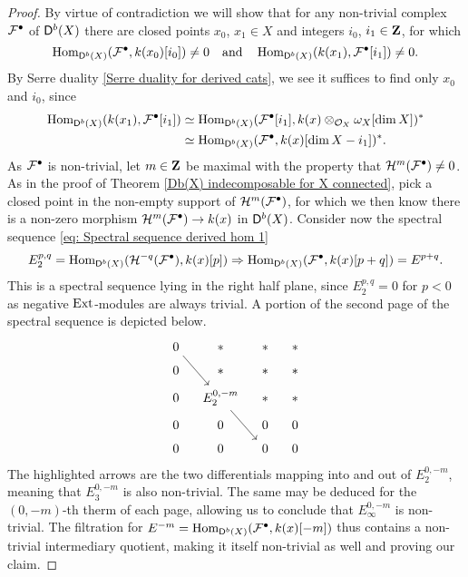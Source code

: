 \begin{proof}
    By virtue of contradiction we will show that for any non-trivial complex $\mathcal F^\bullet$ of $\mathsf{D}^b(X)$ there are closed points $x_0$, $x_1 \in X$ and integers $i_0$, $i_1 \in \mathbf Z$, for which
    \[
        \operatorname{Hom}_{\mathsf{D}^b(X)}(\mathcal F^\bullet, k(x_0)[i_0]) \neq 0 \quad \text{and} \quad \operatorname{Hom}_{\mathsf{D}^b(X)}(k(x_1), \mathcal F^\bullet[i_1]) \neq 0.
    \] 
    By Serre duality \ref{Serre duality for derived cats}, we see it suffices to find only $x_0$ and $i_0$, since
    \begin{align*}
        \operatorname{Hom}_{\mathsf{D}^b(X)}(k(x_1), \mathcal F^\bullet[i_1]) 
        &\simeq \operatorname{Hom}_{\mathsf{D}^b(X)}(\mathcal F^\bullet[i_1], k(x) \otimes_{{\mathcal{O}_{X}}} \omega_X[\dim X])^* \\
        &\simeq \operatorname{Hom}_{\mathsf{D}^b(X)}(\mathcal F^\bullet, k(x)[\dim X - i_1])^*. 
    \end{align*}
    As $\mathcal F^\bullet$ is non-trivial, let $m \in \mathbf Z$ be maximal with the property that $\mathcal{H}^m(\mathcal F^\bullet) \neq 0$. As in the proof of Theorem \ref{Db(X) indecomposable for X connected}, pick a closed point in the non-empty support of $\mathcal H^m(\mathcal F^\bullet)$, for which we then know there is a non-zero morphism $\mathcal H^m(\mathcal F^\bullet) \to k(x)$ in $\mathsf{D}^b(X)$. Consider now the spectral sequence \eqref{eq: Spectral sequence derived hom 1}
    \[
        E^{p,q}_2 = \operatorname{Hom}_{\mathsf{D}^b(X)}(\mathcal H^{-q}(\mathcal F^\bullet), k(x)[p]) \Rightarrow \operatorname{Hom}_{\mathsf{D}^b(X)}(\mathcal F^\bullet, k(x)[p+q]) = E^{p+q}.  
    \] 
    This is a spectral sequence lying in the right half plane, since $E^{p,q}_2 = 0$ for $p < 0$ as negative $\operatorname{Ext}$-modules are always trivial. A portion of the second page of the spectral sequence is depicted below.
    \[\begin{tikzcd}[column sep = 1em, row sep = 0.5em]
        0 & {*} & {*} & {*} \\
        0 & {*} & {*} & {*} \\
        0 & {E^{0, -m}_2} & {*} & {*} \\
        0 & 0 & 0 & 0 \\
        0 & 0 & 0 & 0
        \arrow[from=1-1, to=3-2]
        \arrow[from=3-2, to=5-3]
    \end{tikzcd}\]
    The highlighted arrows are the two differentials mapping into and out of $E^{0,-m}_2$, meaning that $E^{0,-m}_3$ is also non-trivial. The same may be deduced for the $(0,-m)$-th therm of each page, allowing us to conclude that $E^{0,-m}_\infty$ is non-trivial. The filtration for $E^{-m} = \operatorname{Hom}_{\mathsf{D}^b(X)}(\mathcal F^\bullet, k(x)[-m])$ thus contains a non-trivial intermediary quotient, making it itself non-trivial as well and proving our claim. 
\end{proof}

